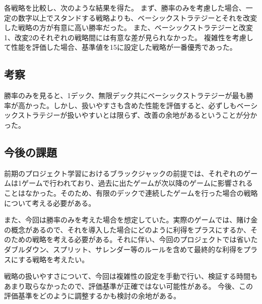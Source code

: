 各戦略を比較し、次のような結果を得た。
まず、勝率のみを考慮した場合、一定の数字以上でスタンドする戦略よりも、ベーシックストラテジーとそれを改変した戦略の方が有意に高い勝率だった。
また、ベーシックストラテジーと改変1、改変2のそれぞれの戦略間には有意な差が見られなかった。
複雑性を考慮して性能を評価した場合、基準値を15に設定した戦略が一番優秀であった。

\subsection{考察}

勝率のみを見ると、1デック、無限デック共にベーシックストラテジーが最も勝率が高かった。しかし、扱いやすさも含めた性能を評価すると、必ずしもベーシックストラテジーが扱いやすいとは限らず、改善の余地があるということが分かった。

\subsection{今後の課題}

前期のプロジェクト学習におけるブラックジャックの前提では、それぞれのゲームは1ゲームで行われており、過去に出たゲームが次以降のゲームに影響されることはなかった。そのため、有限のデックで連続したゲームを行った場合の戦略について考える必要がある。

また、今回は勝率のみを考えた場合を想定していた。実際のゲームでは、賭け金の概念があるので、それを導入した場合にどのように利得をプラスにするか、そのための戦略を考える必要がある。それに伴い、今回のプロジェクトでは省いたダブルダウン、スプリット、サレンダー等のルールを含めて最終的な利得をプラスにする戦略を考えたい。

戦略の扱いやすさについて、今回は複雑性の設定を手動で行い、検証する時間もあまり取らなかったので、評価基準が正確ではない可能性がある。
今後、この評価基準をどのように調整するかも検討の余地がある。

